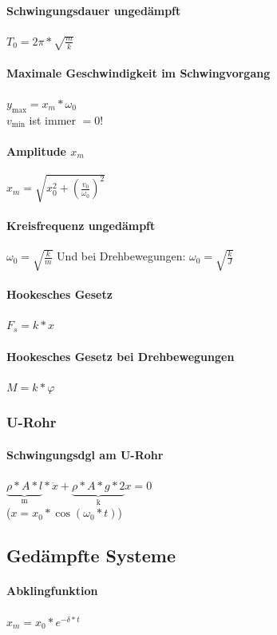 \documentclass[12pt, a4paper]{scrreprt}
\begin{document}
\paragraph{Schwingungsdauer ungedämpft} \dotfill \(T_0=2\pi*\sqrt{\frac{m}{k}}\)
\paragraph{Maximale Geschwindigkeit im Schwingvorgang} \dotfill \(y_{\max} = x_m * \omega _0\)\\
\myhspace \textcolor{myred}{\(v_{\min}\) ist immer \(= 0\)!}
\paragraph{Amplitude \(x_m\)} \dotfill \(x_m = \sqrt{x_0^2 + {\left( \frac{v_0}{\omega _0} \right)}^2}\)
\paragraph{Kreisfrequenz ungedämpft} \dotfill \(\omega_0=\sqrt{\frac{k}{m}}\) Und bei Drehbewegungen: \(\omega_0=\sqrt{\frac{k}{J}}\)
\paragraph{Hookesches Gesetz} \dotfill \(F_s=k*x\)
\paragraph{Hookesches Gesetz bei Drehbewegungen} \dotfill \(M = k * \varphi\)

\subsubsection{U-Rohr}
\paragraph{Schwingungsdgl am U-Rohr} \dotfill \(\underbrace{\rho*A*l}_\text{m}*\ddot x+\underbrace{\rho*A*g*2}_\text{k}x=0\)\\
(\(x=x_0*\cos(\omega_0*t)\))


\subsection{Gedämpfte Systeme}

\paragraph{Abklingfunktion} \dotfill \(x_m=x_0*e^{-\delta*t}\)
\end{document}
